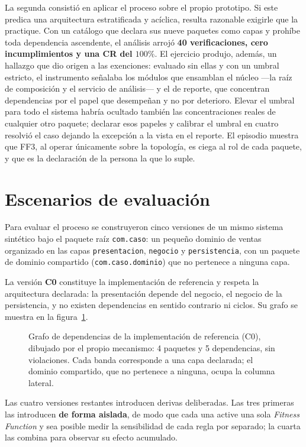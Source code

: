 La segunda consistió en aplicar el proceso sobre el propio prototipo. Si este predica una arquitectura estratificada y acíclica, resulta razonable exigirle que la practique. Con un catálogo que declara sus nueve paquetes como capas y prohíbe toda dependencia ascendente, el análisis arrojó \textbf{40 verificaciones, cero incumplimientos y una CR del $100\%$}. El ejercicio produjo, además, un hallazgo que dio origen a las exenciones: evaluado sin ellas y con un umbral estricto, el instrumento señalaba los módulos que ensamblan el núcleo ---la raíz de composición y el servicio de análisis--- y el de reporte, que concentran dependencias por el papel que desempeñan y no por deterioro. Elevar el umbral para todo el sistema habría ocultado también las concentraciones reales de cualquier otro paquete; declarar esos papeles y calibrar el umbral en cuatro resolvió el caso dejando la excepción a la vista en el reporte. El episodio muestra que FF3, al operar únicamente sobre la topología, es ciega al rol de cada paquete, y que es la declaración de la persona la que lo suple.

\section{Escenarios de evaluación}
\label{sec:escenarios}
Para evaluar el proceso se construyeron cinco versiones de un mismo sistema sintético bajo el paquete raíz \texttt{com.caso}: un pequeño dominio de ventas organizado en las capas \texttt{presentacion}, \texttt{negocio} y \texttt{persistencia}, con un paquete de dominio compartido (\texttt{com.caso.dominio}) que no pertenece a ninguna capa.

La versión \textbf{C0} constituye la implementación de referencia y respeta la arquitectura declarada: la presentación depende del negocio, el negocio de la persistencia, y no existen dependencias en sentido contrario ni ciclos. Su grafo se muestra en la figura~\ref{fig:grafo-base}.

\begin{figure}[H]
\centering
{}
\caption{Grafo de dependencias de la implementación de referencia (C0), dibujado por el propio mecanismo: 4 paquetes y 5 dependencias, sin violaciones. Cada banda corresponde a una capa declarada; el dominio compartido, que no pertenece a ninguna, ocupa la columna lateral.}
\label{fig:grafo-base}
\end{figure}

Las cuatro versiones restantes introducen derivas deliberadas. Las tres primeras las introducen \textbf{de forma aislada}, de modo que cada una active una sola \textit{Fitness Function} y sea posible medir la sensibilidad de cada regla por separado; la cuarta las combina para observar su efecto acumulado.

